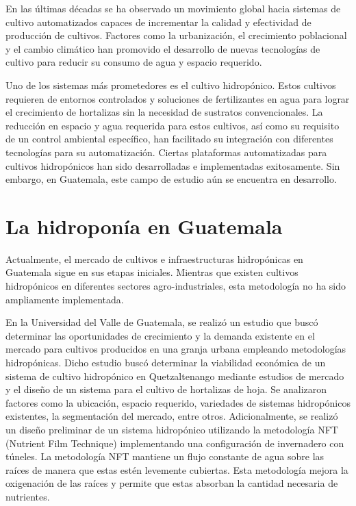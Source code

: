 En las últimas décadas se ha observado un movimiento global hacia sistemas de cultivo automatizados capaces de incrementar la calidad y efectividad de producción de cultivos. Factores como la urbanización, el crecimiento poblacional y el cambio climático han promovido el desarrollo de nuevas tecnologías de cultivo para reducir su consumo de agua y espacio requerido.

Uno de los sistemas más prometedores es el cultivo hidropónico. Estos cultivos requieren de entornos controlados y soluciones de fertilizantes en agua para lograr el crecimiento de hortalizas sin la necesidad de sustratos convencionales. La reducción en espacio y agua requerida para estos cultivos, así como su requisito de un control ambiental específico, han facilitado su integración con diferentes tecnologías para su automatización. Ciertas plataformas automatizadas para cultivos hidropónicos han sido desarrolladas e implementadas exitosamente. Sin embargo, en Guatemala, este campo de estudio aún se encuentra en desarrollo.

\section{La hidroponía en Guatemala}
Actualmente, el mercado de cultivos e infraestructuras hidropónicas en Guatemala sigue en sus etapas iniciales. Mientras que existen cultivos hidropónicos en diferentes sectores agro-industriales, esta metodología no ha sido ampliamente implementada.

En la Universidad del Valle de Guatemala, se realizó un estudio que buscó determinar las oportunidades de crecimiento y la demanda existente en el mercado para cultivos producidos en una granja urbana empleando metodologías hidropónicas. \cite{gonzalez_natareno2021_tesis} Dicho estudio buscó determinar la viabilidad económica de un sistema de cultivo hidropónico en Quetzaltenango mediante estudios de mercado y el diseño de un sistema para el cultivo de hortalizas de hoja. Se analizaron factores como la ubicación, espacio requerido, variedades de sistemas hidropónicos existentes, la segmentación del mercado, entre otros. Adicionalmente, se realizó un diseño preliminar de un sistema hidropónico utilizando la metodología NFT (Nutrient Film Technique) implementando una configuración de invernadero con túneles. La metodología NFT mantiene un flujo constante de agua sobre las raíces de manera que estas estén levemente cubiertas. Esta metodología mejora la oxigenación de las raíces y permite que estas absorban la cantidad necesaria de nutrientes. 

